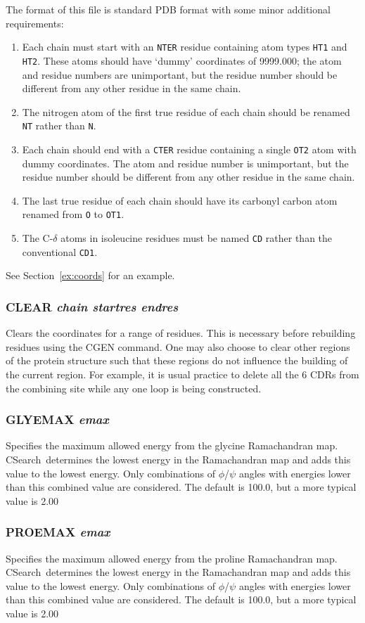 \documentclass{report}
\newcommand{\cs}{CSearch}
\begin{document}
The format of this file is standard PDB format with some minor additional
requirements:
\begin{enumerate}
\item Each chain must start with an {\tt NTER} residue containing atom types
{\tt HT1} and {\tt HT2}. These atoms should have `dummy' coordinates of
9999.000; the atom and residue numbers are unimportant, but the residue
number should be different from any other residue in the same chain.
\item The nitrogen atom of the first true residue of each chain should be 
renamed {\tt NT} rather than {\tt N}.
\item Each chain should end with a {\tt CTER} residue containing a single
{\tt OT2} atom with dummy coordinates. The atom and residue number is
unimportant, but the residue number should be different from any other
residue in the same chain.
\item The last true residue of each chain should have its carbonyl carbon
atom renamed from {\tt O} to {\tt OT1}.
\item The C-$\delta$ atoms in isoleucine residues must be named {\tt CD}
rather than the conventional {\tt CD1}.
\end{enumerate}
See Section~\ref{ex:coords} for an example.

\subsubsection{CLEAR {\em chain startres endres}}
Clears the coordinates for a range of residues. This is necessary before
rebuilding residues using the CGEN command. One may also choose to clear
other regions of the protein structure such that these regions do not
influence the building of the current region. For example, it is usual
practice to delete all the 6 CDRs from the combining site while any one
loop is being constructed.

\subsubsection{GLYEMAX {\em emax}}
Specifies the maximum allowed energy from the glycine Ramachandran map. 
\cs\ determines
the lowest energy in the Ramachandran map and adds this value to the lowest
energy. Only combinations of $\phi$/$\psi$ angles with energies lower than this
combined value are considered. The default is 100.0, but a more typical 
value is 2.00

\subsubsection{PROEMAX {\em emax}}
Specifies the maximum allowed energy from the proline Ramachandran map. 
\cs\ determines
the lowest energy in the Ramachandran map and adds this value to the lowest
energy. Only combinations of $\phi$/$\psi$ angles with energies lower than this
combined value are considered. The default is 100.0, but a more typical 
value is 2.00
\end{document}
